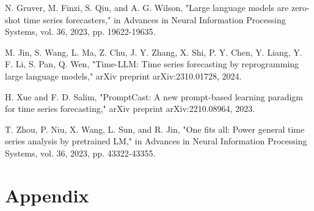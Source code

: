 \documentclass[conference]{IEEEtran}
\begin{document}
\begin{thebibliography}{00}
 N. Gruver, M. Finzi, S. Qiu, and A. G. Wilson, "Large language models are zero-shot time series forecasters," in Advances in Neural Information Processing Systems, vol. 36, 2023, pp. 19622-19635.

 M. Jin, S. Wang, L. Ma, Z. Chu, J. Y. Zhang, X. Shi, P. Y. Chen, Y. Liang, Y. F. Li, S. Pan, Q. Wen, "Time-LLM: Time series forecasting by reprogramming large language models," arXiv preprint arXiv:2310.01728, 2024.

 H. Xue and F. D. Salim, "PromptCast: A new prompt-based learning paradigm for time series forecasting," arXiv preprint arXiv:2210.08964, 2023.

 T. Zhou, P. Niu, X. Wang, L. Sun, and R. Jin, "One fits all: Power general time series analysis by pretrained LM," in Advances in Neural Information Processing Systems, vol. 36, 2023, pp. 43322-43355.
\end{thebibliography}
\vspace{12pt}

\section{Appendix}
\end{document}
